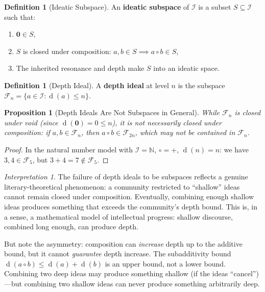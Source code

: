 \documentclass[11pt,openany]{book}
\theoremstyle{definition}
\newtheorem{definition}[axiom]{Definition}
\theoremstyle{plain}
\newtheorem{proposition}[axiom]{Proposition}
\theoremstyle{remark}
\newtheorem{interpretation}[axiom]{Interpretation}
\newcommand{\IS}{\mathcal{I}}               %
\newcommand{\compose}{\circ}                 %
\newcommand{\void}{\mathbf{0}}              %
\newcommand{\depth}{\operatorname{d}}       %
\newcommand{\Filt}[1]{\mathcal{F}_{#1}}     %
\begin{document}
\begin{definition}[Ideatic Subspace]
An \textbf{ideatic subspace} of $\IS$ is a subset $S \subseteq \IS$ such that:
\begin{enumerate}
\item $\void \in S$,
\item $S$ is closed under composition: $a, b \in S \implies a \compose b \in S$,
\item The inherited resonance and depth make $S$ into an ideatic space.
\end{enumerate}
\end{definition}

\begin{definition}[Depth Ideal]
A \textbf{depth ideal} at level $n$ is the subspace $\Filt{n} = \{ a \in \IS : \depth(a) \leq n \}$.
\end{definition}

\begin{proposition}[Depth Ideals Are Not Subspaces in General]
While $\Filt{n}$ is closed under void (since $\depth(\void) = 0 \leq n$), it is \emph{not} necessarily closed under composition: if $a, b \in \Filt{n}$, then $a \compose b \in \Filt{2n}$, which may not be contained in $\Filt{n}$.
\end{proposition}

\begin{proof}
In the natural number model with $\IS = \mathbb{N}$, $\compose = +$, $\depth(n) = n$: we have $3, 4 \in \Filt{5}$, but $3 + 4 = 7 \notin \Filt{5}$.
\end{proof}

\begin{interpretation}
The failure of depth ideals to be subspaces reflects a genuine literary-theoretical phenomenon: a community restricted to ``shallow'' ideas cannot remain closed under composition. Eventually, combining enough shallow ideas produces something that exceeds the community's depth bound. This is, in a sense, a mathematical model of intellectual progress: shallow discourse, combined long enough, can produce depth.

But note the asymmetry: composition can \emph{increase} depth up to the additive bound, but it cannot \emph{guarantee} depth increase. The subadditivity bound $\depth(a \compose b) \leq \depth(a) + \depth(b)$ is an upper bound, not a lower bound. Combining two deep ideas may produce something shallow (if the ideas ``cancel'')---but combining two shallow ideas can never produce something arbitrarily deep.
\end{interpretation}
\end{document}
